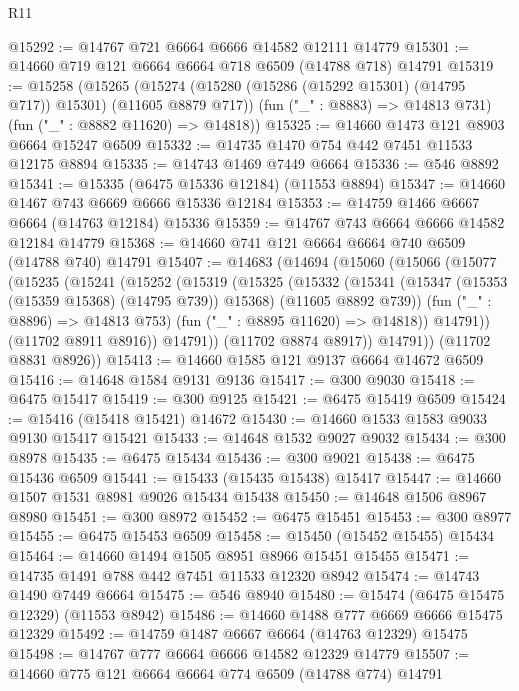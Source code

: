 \begin{lexlean}{R11}
\begin{coremodule}
@15292 := @14767 @721 @6664 @6666 @14582 @12111 @14779
@15301 := @14660 @719 @121 @6664 @6664 @718 @6509 (@14788 @718) @14791
@15319 := @15258
    (@15265
      (@15274 (@15280 (@15286 (@15292 @15301) (@14795 @717)) @15301) (@11605 @8879 @717))
      (fun ("_" : @8883) => @14813 @731)
      (fun ("_" : @8882 @11620) => @14818))
@15325 := @14660 @1473 @121 @8903 @6664 @15247 @6509
@15332 := @14735 @1470 @754 @442 @7451 @11533 @12175 @8894
@15335 := @14743 @1469 @7449 @6664
@15336 := @546 @8892
@15341 := @15335 (@6475 @15336 @12184) (@11553 @8894)
@15347 := @14660 @1467 @743 @6669 @6666 @15336 @12184
@15353 := @14759 @1466 @6667 @6664 (@14763 @12184) @15336
@15359 := @14767 @743 @6664 @6666 @14582 @12184 @14779
@15368 := @14660 @741 @121 @6664 @6664 @740 @6509 (@14788 @740) @14791
@15407 := @14683
    (@14694
      (@15060
        (@15066
          (@15077
            (@15235
              (@15241
                (@15252
                  (@15319
                    (@15325
                      (@15332
                        (@15341
                          (@15347 (@15353 (@15359 @15368) (@14795 @739)) @15368)
                          (@11605 @8892 @739))
                        (fun ("_" : @8896) => @14813 @753)
                        (fun ("_" : @8895 @11620) => @14818))
                      @14791))
                  (@11702 @8911 @8916))
                @14791))
            (@11702 @8874 @8917))
          @14791))
      (@11702 @8831 @8926))
@15413 := @14660 @1585 @121 @9137 @6664 @14672 @6509
@15416 := @14648 @1584 @9131 @9136
@15417 := @300 @9030
@15418 := @6475 @15417
@15419 := @300 @9125
@15421 := @6475 @15419 @6509
@15424 := @15416 (@15418 @15421) @14672
@15430 := @14660 @1533 @1583 @9033 @9130 @15417 @15421
@15433 := @14648 @1532 @9027 @9032
@15434 := @300 @8978
@15435 := @6475 @15434
@15436 := @300 @9021
@15438 := @6475 @15436 @6509
@15441 := @15433 (@15435 @15438) @15417
@15447 := @14660 @1507 @1531 @8981 @9026 @15434 @15438
@15450 := @14648 @1506 @8967 @8980
@15451 := @300 @8972
@15452 := @6475 @15451
@15453 := @300 @8977
@15455 := @6475 @15453 @6509
@15458 := @15450 (@15452 @15455) @15434
@15464 := @14660 @1494 @1505 @8951 @8966 @15451 @15455
@15471 := @14735 @1491 @788 @442 @7451 @11533 @12320 @8942
@15474 := @14743 @1490 @7449 @6664
@15475 := @546 @8940
@15480 := @15474 (@6475 @15475 @12329) (@11553 @8942)
@15486 := @14660 @1488 @777 @6669 @6666 @15475 @12329
@15492 := @14759 @1487 @6667 @6664 (@14763 @12329) @15475
@15498 := @14767 @777 @6664 @6666 @14582 @12329 @14779
@15507 := @14660 @775 @121 @6664 @6664 @774 @6509 (@14788 @774) @14791

\end{coremodule}
\end{lexlean}
